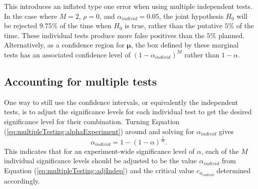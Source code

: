 \documentclass[letterpaper,12pt,oneside,final]{article}
\newcommand{\sv}[1]{\boldsymbol{#1}}   %
\begin{document}
This introduces an inflated type one error when using multiple independent tests. In the case where $M=2$, $\rho = 0$, and $\alpha_{individ} = 0.05$, the joint hypothesis $H_0$ will be rejected $9.75\%$ of the time when $H_0$ is true, rather than the putative $5\%$ of the time. These individual tests produce more false positives than the $5\%$ planned. Alternatively, as a confidence region for $\sv{\mu}$, the box defined by these marginal tests has an associated confidence level of $(1 - \alpha_{individ})^M$ rather than $1 - \alpha$. %

\subsection{Accounting for multiple tests}

One way to still use the confidence intervals, or equivalently the independent tests, is to adjust the significance levels for each individual test to get the desired significance level for their combination. Turning Equation (\ref{eq:multipleTesting:alphaExperiment}) around and solving for $\alpha_{individ}$ gives
\begin{equation}
\alpha_{individ} = 1 - (1 - \alpha)^\frac{1}{M}.
\label{eq:multipleTesting:adjIndep}
\end{equation}
This indicates that for an experiment-wide significance level of $\alpha$, each of the $M$ individual significance levels should be adjusted to be the value $\alpha_{individ}$ from Equation (\ref{eq:multipleTesting:adjIndep}) and the critical value $c_{\alpha_{individ}}$ determined accordingly.   
\end{document}
